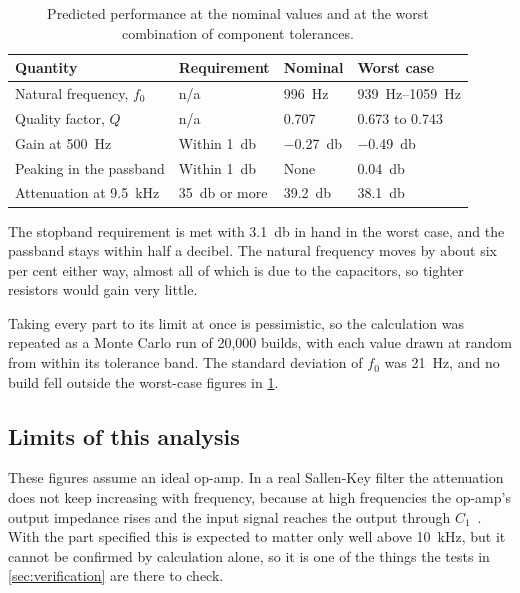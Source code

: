 \begin{table}[htbp]
\centering
\begin{tabularx}{\textwidth}{@{} X l l l @{}}
\toprule
\textbf{Quantity} & \textbf{Requirement} & \textbf{Nominal} & \textbf{Worst case} \\
\midrule
Natural frequency, $f_0$                 & n/a                    & \qty{996}{\hertz}    & \qtyrange{939}{1059}{\hertz} \\
Quality factor, $Q$                      & n/a                    & 0.707                & 0.673 to 0.743 \\
Gain at \qty{500}{\hertz}                & Within \qty{1}{\decibel} & \qty{-0.27}{\decibel} & \qty{-0.49}{\decibel} \\
Peaking in the passband                  & Within \qty{1}{\decibel} & None                 & \qty{0.04}{\decibel} \\
Attenuation at \qty{9.5}{\kilo\hertz}    & \qty{35}{\decibel} or more & \qty{39.2}{\decibel} & \qty{38.1}{\decibel} \\
\bottomrule
\end{tabularx}
\caption{Predicted performance at the nominal values and at the worst
combination of component tolerances.}
\label{tab:tolerance}
\end{table}

The stopband requirement is met with \qty{3.1}{\decibel} in hand in the worst
case, and the passband stays within half a decibel. The natural frequency
moves by about six per cent either way, almost all of which is due to the
capacitors, so tighter resistors would gain very little.

Taking every part to its limit at once is pessimistic, so the calculation was
repeated as a Monte Carlo run of 20,000 builds, with each value drawn at
random from within its tolerance band. The standard deviation of $f_0$ was
\qty{21}{\hertz}, and no build fell outside the worst-case figures in
\cref{tab:tolerance}.

\subsection{Limits of this analysis}

These figures assume an ideal op-amp. In a real Sallen-Key filter the
attenuation does not keep increasing with frequency, because at high
frequencies the op-amp's output impedance rises and the input signal reaches
the output through $C_1$~\cite{karki_sallen_key_2002}. With the part
specified this is expected to matter only well above \qty{10}{\kilo\hertz},
but it cannot be confirmed by calculation alone, so it is one of the things
the tests in \cref{sec:verification} are there to check.
